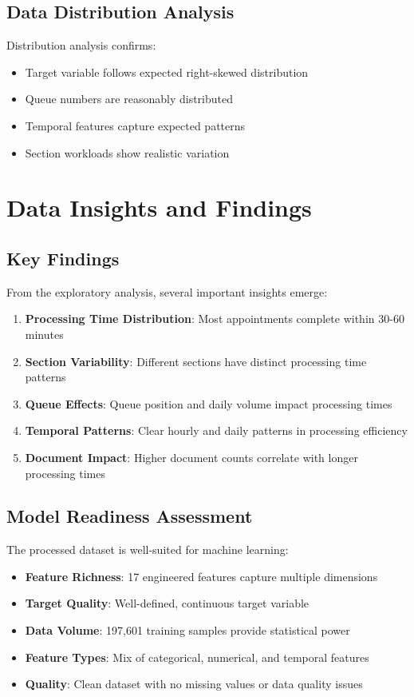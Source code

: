 \documentclass[12pt,a4paper]{article}
\begin{document}
\subsection{Data Distribution Analysis}

Distribution analysis confirms:

\begin{itemize}
    \item Target variable follows expected right-skewed distribution
    \item Queue numbers are reasonably distributed
    \item Temporal features capture expected patterns
    \item Section workloads show realistic variation
\end{itemize}

\section{Data Insights and Findings}

\subsection{Key Findings}

From the exploratory analysis, several important insights emerge:

\begin{enumerate}
    \item \textbf{Processing Time Distribution}: Most appointments complete within 30-60 minutes
    \item \textbf{Section Variability}: Different sections have distinct processing time patterns
    \item \textbf{Queue Effects}: Queue position and daily volume impact processing times
    \item \textbf{Temporal Patterns}: Clear hourly and daily patterns in processing efficiency
    \item \textbf{Document Impact}: Higher document counts correlate with longer processing times
\end{enumerate}

\subsection{Model Readiness Assessment}

The processed dataset is well-suited for machine learning:

\begin{itemize}
    \item \textbf{Feature Richness}: 17 engineered features capture multiple dimensions
    \item \textbf{Target Quality}: Well-defined, continuous target variable
    \item \textbf{Data Volume}: 197,601 training samples provide statistical power
    \item \textbf{Feature Types}: Mix of categorical, numerical, and temporal features
    \item \textbf{Quality}: Clean dataset with no missing values or data quality issues
\end{itemize}
\end{document}
